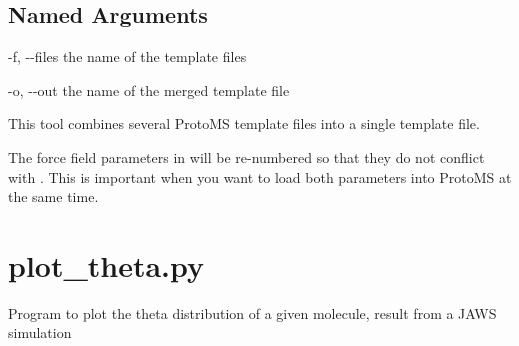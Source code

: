 \documentclass[letterpaper,10pt,english]{sphinxmanual}
\begin{document}
\subsection{Named Arguments}
\label{\detokenize{tools:Named Arguments}}\begin{optionlist}{3cm}
\item [-f, -{-}files]  
the name of the template files
\item [-o, -{-}out]  
the name of the merged template file
\end{optionlist}


%
\begin{sphinxVerbatim}[commandchars=\\\{\}]
     
\end{sphinxVerbatim}


This tool combines several ProtoMS template files into a single template file.

The force field parameters in  will be re-numbered so that they do not conflict with . This is important when you want to load both parameters into ProtoMS at the same time.


\section{plot\_theta.py}
\label{\detokenize{tools:plot-theta-py}}

Program to plot the theta distribution of a given molecule, result from a JAWS simulation


%
\begin{sphinxVerbatim}[commandchars=\\\{\}]
  \PYG{p}{[}\PYG{p}{]} \PYG{p}{[} \PYG{p}{]} \PYG{p}{[} \PYG{p}{]} \PYG{p}{[} \PYG{p}{]}
                     \PYG{p}{[} \PYG{p}{]} \PYG{p}{[} \PYG{p}{]}
\end{sphinxVerbatim}
\end{document}
